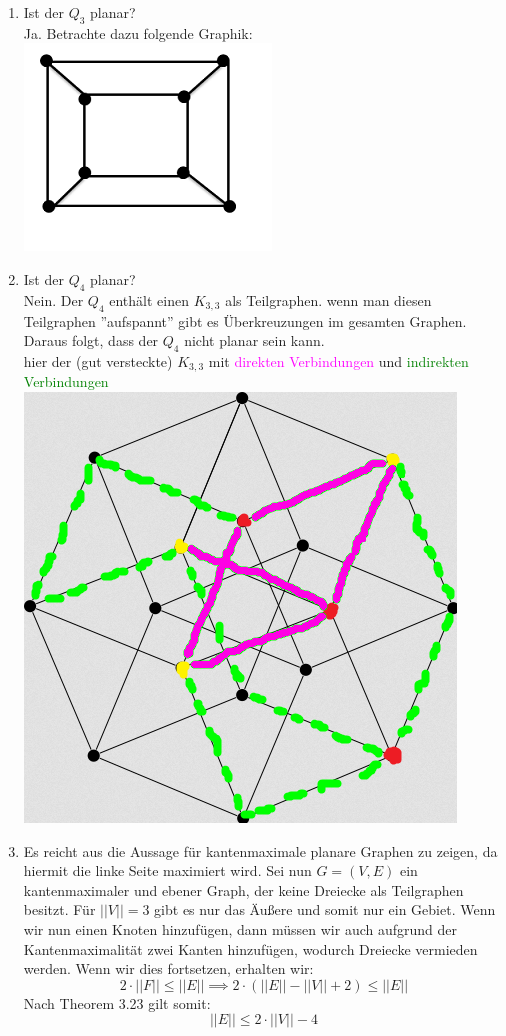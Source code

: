 \begin{enumerate}[label=(\alph*)]
        \item Ist der $Q_3$ planar? \\
        Ja. Betrachte dazu folgende Graphik:\\
        \includegraphics{Q3}
        
        \item Ist der $Q_4$ planar?\\
        Nein. Der $Q_4$ enthält einen $K_{3,3}$ als Teilgraphen. wenn man diesen Teilgraphen ''aufspannt'' 
        gibt es Überkreuzungen im gesamten Graphen. Daraus folgt, dass der $Q_4$ nicht planar sein kann. \\
        hier der (gut versteckte) $K_{3,3}$ mit \textcolor{magenta}{direkten Verbindungen} und \textcolor{green}{indirekten Verbindungen} \\ \includegraphics{Q4}
        
        \item Es reicht aus die Aussage für kantenmaximale planare Graphen zu zeigen, da hiermit die 
        linke Seite maximiert wird. Sei nun $G=(V,E)$ ein kantenmaximaler und ebener Graph, der keine 
        Dreiecke als Teilgraphen besitzt. Für $||V||=3$ gibt es nur das Äußere und somit nur ein Gebiet. 
        Wenn wir nun einen Knoten hinzufügen, dann müssen wir auch aufgrund der Kantenmaximalität zwei 
        Kanten hinzufügen, wodurch Dreiecke vermieden werden.  Wenn wir dies fortsetzen, erhalten wir:
        $$ 2 \cdot ||F|| \le ||E||\implies 2 \cdot \left(||E|| - ||V|| + 2 \right) \le ||E||$$
        Nach Theorem 3.23 gilt somit:
        $$||E|| \le 2 \cdot ||V|| - 4 $$ 
        

\end{enumerate}
